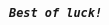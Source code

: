 \documentclass[UTF8, 16pt]{beamer}
\begin{document}
\begin{CJK*}{UTF8}{gbsn}
\begin{frame}[allowframebreaks]%
	\begin{center}
		\Huge\textbf{\textit{\texttt{Best of luck!}}}
	\end{center}
\end{frame}



%

\end{CJK*}
\end{document}
